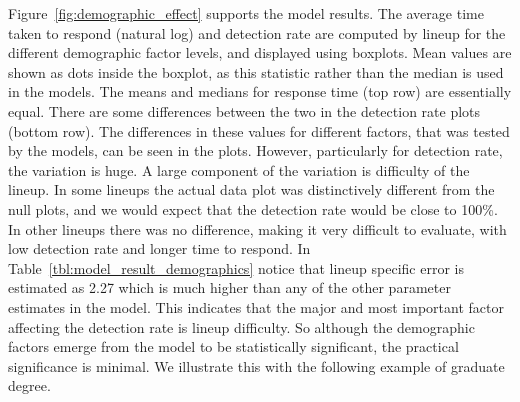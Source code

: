 \documentclass[10pt]{article}\usepackage[]{graphicx}\usepackage[]{xcolor}
\begin{document}
Figure~\ref{fig:demographic_effect} supports the model results. The average time taken to respond (natural log) and detection rate are computed by lineup for the different demographic factor levels, and displayed using boxplots. Mean values are shown as dots inside the boxplot, as this statistic rather than the median is used in the models. The means and medians for response time (top row) are essentially equal. There are some differences between the two in the detection rate plots (bottom row). The differences in these values for different factors, that was tested by the models, can be seen in the plots. However, particularly for detection rate, the variation is huge. A large component of the variation is difficulty of the lineup. In some lineups the actual data plot was distinctively different from the null plots, and we would expect that the detection rate would be close to 100\%. In other lineups there was no difference, making it very difficult to evaluate, with low detection rate and longer time to respond. In Table~\ref{tbl:model_result_demographics} notice that lineup specific error is estimated as 2.27 which is much higher than any of the other parameter estimates in the model. This indicates that the major and most important factor affecting the detection rate is  lineup difficulty.  So although the demographic factors emerge from the model to be statistically significant, the practical significance is minimal. We illustrate this with the following example of graduate degree.
\end{document}
